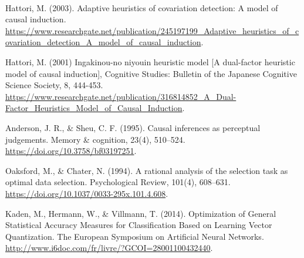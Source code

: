 \documentclass[12pt,twoside]{report}
\begin{document}
\begin{thebibliography}{26}
‌

Hattori, M. (2003). Adaptive heuristics of covariation detection: A model of causal induction. \url{https://www.researchgate.net/publication/245197199_Adaptive_heuristics_of_covariation_detection_A_model_of_causal_induction}.

Hattori, M. (2001) Ingakinou-no niyouin heuristic model [A dual-factor heuristic model of causal induction],
Cognitive Studies: Bulletin of the Japanese Cognitive Science Society, 8, 444-453. \url{https://www.researchgate.net/publication/316814852_A_Dual-Factor_Heuristics_Model_of_Causal_Induction}.

Anderson, J. R., \& Sheu, C. F. (1995). Causal inferences as perceptual judgements. Memory \& cognition, 23(4), 510–524. \url{https://doi.org/10.3758/bf03197251}.

Oaksford, M., \& Chater, N. (1994). A rational analysis of the selection task as optimal data selection. Psychological Review, 101(4), 608–631. \url{https://doi.org/10.1037/0033-295x.101.4.608}.

Kaden, M., Hermann, W., \& Villmann, T. (2014). Optimization of General Statistical Accuracy Measures for Classification Based on Learning Vector Quantization. The European Symposium on Artificial Neural Networks. \url{http://www.i6doc.com/fr/livre/?GCOI=28001100432440}.


\end{thebibliography}
\end{document}

